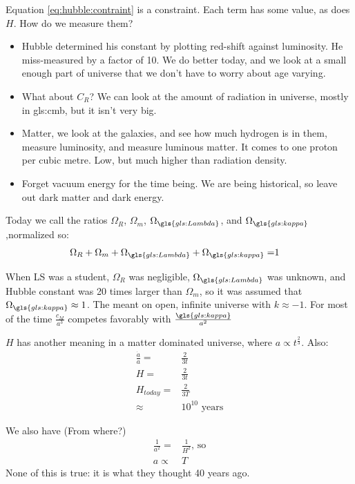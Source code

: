 \documentclass[]{article}
\begin{document}
Equation \eqref{eq:hubble:contraint} is a constraint. Each term has some value, as does $H$. How do we measure them?

\begin{itemize}
	\item Hubble determined his constant by plotting red-shift against luminosity. He miss-measured by a factor of 10. We do better today, and we look at a small enough part of universe that we don't have to worry about age varying.

	\item What about $C_R$? We can look at the amount of radiation in universe, mostly in \gls{gls:cmb}, but it isn't very big.

	\item Matter, we look at the galaxies, and see how much hydrogen is in them, measure luminosity, and measure luminous matter. It comes to one proton per cubic metre. Low, but much higher than radiation density.
	
	\item Forget vacuum energy for the time being. We are being historical, so leave out dark matter and dark energy.
\end{itemize}

Today we call the ratios $\Omega_R$, $\Omega_m$, $\Omega_{\gls{gls:Lambda}}$, and $\Omega_{\gls{gls:kappa}}$,normalized so:
\begin{align*}
	\Omega_R+\Omega_m+\Omega_{\gls{gls:Lambda}}+\Omega_{\gls{gls:kappa}}=&1
\end{align*}

When LS was a student, $\Omega_R$ was negligible, $\Omega_{\gls{gls:Lambda}}$ was unknown, and Hubble constant was 20 times larger than $\Omega_m$, so it was assumed that $\Omega_{\gls{gls:kappa}}\approx 1$. The meant on open, infinite universe with $k\approx -1$. For most of the time $\frac{c_M}{a^3}$ competes favorably with $\frac{\gls{gls:kappa}}{a^2}$

$H$ has another meaning in a matter dominated universe, where $a\propto t^\frac{2}{3}$. Also:
\begin{align*}
	\frac{\dot{a}}{a}=&\frac{2}{3t}\\
	H=&\frac{2}{3t}\\
	H_{today}=&\frac{2}{3T}\\
	\approx& 10^{10} \text{ years}
\end{align*}

We also have (From where?)
\begin{align*}
	\frac{1}{a^2} =& \frac{1}{H^2} \text{, so} \\
	a \propto& T
\end{align*}
 None of this is true: it is what they thought 40 years ago.
 
\end{document}
